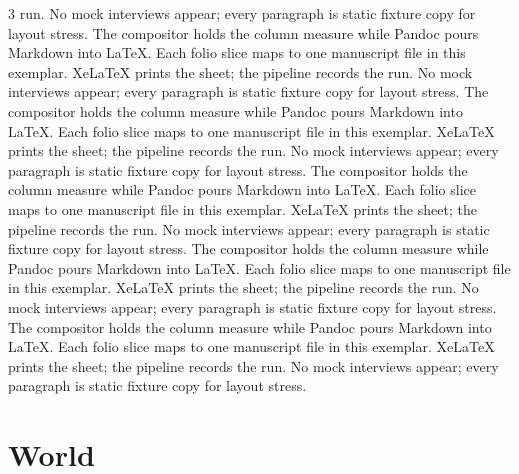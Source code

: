 \documentclass[
]{article}
\begin{document}
\begin{multicols}{3}
run. No mock interviews appear; every paragraph is static fixture copy
for layout stress. The compositor holds the column measure while Pandoc
pours Markdown into LaTeX. Each folio slice maps to one manuscript file
in this exemplar. XeLaTeX prints the sheet; the pipeline records the
run. No mock interviews appear; every paragraph is static fixture copy
for layout stress. The compositor holds the column measure while Pandoc
pours Markdown into LaTeX. Each folio slice maps to one manuscript file
in this exemplar. XeLaTeX prints the sheet; the pipeline records the
run. No mock interviews appear; every paragraph is static fixture copy
for layout stress. The compositor holds the column measure while Pandoc
pours Markdown into LaTeX. Each folio slice maps to one manuscript file
in this exemplar. XeLaTeX prints the sheet; the pipeline records the
run. No mock interviews appear; every paragraph is static fixture copy
for layout stress. The compositor holds the column measure while Pandoc
pours Markdown into LaTeX. Each folio slice maps to one manuscript file
in this exemplar. XeLaTeX prints the sheet; the pipeline records the
run. No mock interviews appear; every paragraph is static fixture copy
for layout stress. The compositor holds the column measure while Pandoc
pours Markdown into LaTeX. Each folio slice maps to one manuscript file
in this exemplar. XeLaTeX prints the sheet; the pipeline records the
run. No mock interviews appear; every paragraph is static fixture copy
for layout stress.

\end{multicols}

\newpage

\section{World}\label{world}
\end{document}
